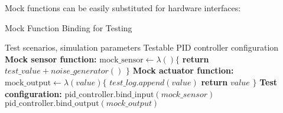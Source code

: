 \documentclass{article}
\begin{document}
Mock functions can be easily substituted for hardware interfaces:

\begin{algorithm}
\caption{Mock Function Binding for Testing}
\label{alg:mock_binding}
\begin{algorithmic}[1]
\REQUIRE Test scenarios, simulation parameters
\ENSURE Testable PID controller configuration
\STATE \textbf{Mock sensor function:}
\STATE $\text{mock\_sensor} \leftarrow \lambda() \{$
\STATE \quad \textbf{return} $test\_value + noise\_generator()$
\STATE $\}$
\STATE
\STATE \textbf{Mock actuator function:}
\STATE $\text{mock\_output} \leftarrow \lambda(value) \{$
\STATE \quad $test\_log.append(value)$
\STATE \quad \textbf{return} $value$
\STATE $\}$
\STATE
\STATE \textbf{Test configuration:}
\STATE $\text{pid\_controller.bind\_input}(mock\_sensor)$
\STATE $\text{pid\_controller.bind\_output}(mock\_output)$
\end{algorithmic}
\end{algorithm}
\end{document}
